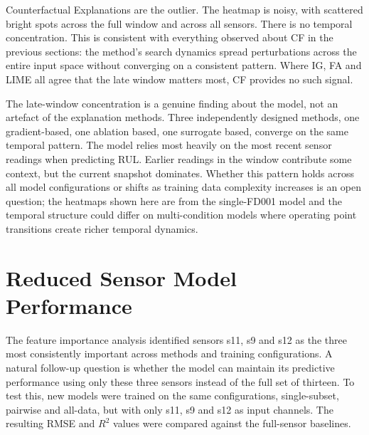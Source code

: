Counterfactual Explanations are the outlier. The heatmap is noisy, with scattered bright spots across the full window and across all sensors. There is no temporal concentration. This is consistent with everything observed about CF in the previous sections: the method's search dynamics spread perturbations across the entire input space without converging on a consistent pattern. Where IG, FA and LIME all agree that the late window matters most, CF provides no such signal.

The late-window concentration is a genuine finding about the model, not an artefact of the explanation methods. Three independently designed methods, one gradient-based, one ablation based, one surrogate based, converge on the same temporal pattern. The model relies most heavily on the most recent sensor readings when predicting RUL. Earlier readings in the window contribute some context, but the current snapshot dominates. Whether this pattern holds across all model configurations or shifts as training data complexity increases is an open question; the heatmaps shown here are from the single-FD001 model and the temporal structure could differ on multi-condition models where operating point transitions create richer temporal dynamics. 

\section{Reduced Sensor Model Performance}
The feature importance analysis identified sensors s11, s9 and s12 as the three most consistently important across methods and training configurations. A natural follow-up question is whether the model can maintain its predictive performance using only these three sensors instead of the full set of thirteen. To test this, new models were trained on the same configurations, single-subset, pairwise and all-data, but with only s11, s9 and s12 as input channels. The resulting RMSE and $R^2$ values were compared against the full-sensor baselines.


